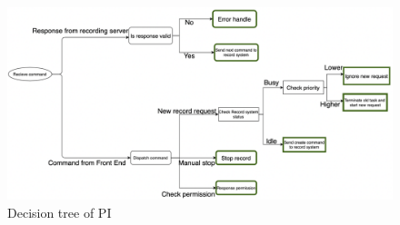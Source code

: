 \begin{figure}[H]
    \centering
    \includegraphics[width=\textwidth]{figsrc/pi-decision-tree.png}
    \caption{Decision tree of PI\label{fig:pi-decision-tree}}
\end{figure}
